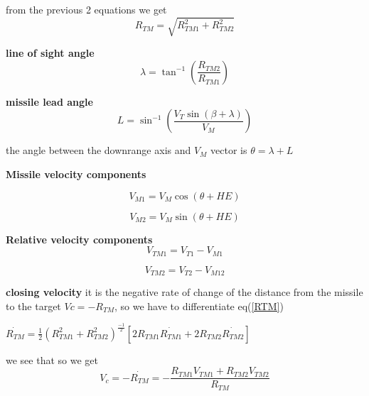 from the previous 2 equations we get
\begin{equation}
	R_{TM} = \sqrt{R_{TM1}^2 + R_{TM2}^2}
	\label{RTM}
\end{equation}

\textbf{line of sight angle}
\begin{equation}
	\lambda = \tan^{-1} (\dfrac{R_{TM2}}{R_{TM1}})
	\label{lambda}
\end{equation}

\textbf{missile lead angle} 
\begin{equation}
	L= \sin^{-1}(\dfrac{V_T \sin(\beta + \lambda)}{V_M})
\end{equation}

the angle between the downrange axis and $V_M$ vector is $\theta = \lambda + L$

\textbf{Missile velocity components} 

\begin{equation}
	V_{M1} = V_M \cos (\theta + HE)
\end{equation}

\begin{equation}
V_{M2} = V_M \sin (\theta + HE)
\end{equation}

\textbf{Relative velocity components}
\begin{equation}
	V_{TM1} = V_{T1} - V_{M1}
\end{equation}

\begin{equation}
V_{TM2} = V_{T2} - V_{M12}
\end{equation}


\textbf{closing velocity} it is the negative rate of change of the distance
from the missile to the target $Vc= -R_{TM} $, so we have to differentiate eq(\ref{RTM})

\begin{center}
	$\dot{R_{TM}}= \frac{1}{2} (R_{TM1}^2 + R_{TM2}^2)^{\frac{-1}{2}} [2 R_{TM1} \dot{R_{TM1}} + 2 R_{TM2} \dot{R_{TM2}}]$
\end{center}

we see that
so we get 
\begin{equation}
	V_c = - \dot{R_{TM}} = - \dfrac{R_{TM1} V_{TM1}+R_{TM2} V_{TM2}}{R_{TM}}
\end{equation}

